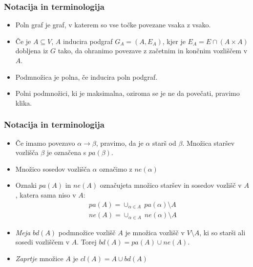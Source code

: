 \documentclass{beamer}
\begin{document}
\begin{frame}
    \frametitle{Notacija in terminologija}
    \begin{itemize}
        \item Poln graf je graf, v katerem so vse točke povezane vsaka z vsako.
        \item  Če je $A \subseteq V$, $A$ inducira podgraf $G_A = (A, E_A)$,
        kjer je $E_A = E \cap (A \times A)$ dobljena iz $G$ tako, da ohranimo povezave z 
        začetnim in končnim vozliščem v $A$.
        \item Podmnožica je polna, če inducira poln podgraf.
        \item Polni podmnožici, ki je maksimalna, oziroma se je ne da povečati, pravimo klika.
   
    \end{itemize}

\end{frame}
\begin{frame}
    \frametitle{Notacija in terminologija}
    \begin{itemize}
        \item Če imamo povezavo $ \alpha \longrightarrow \beta $, pravimo, da je $\alpha$ starš od $\beta$.
        Množica staršev vozlišča $\beta$ je označena s $pa(\beta)$.  
        \item Množico sosedov vozlišča $\alpha$ označimo z $ne(\alpha)$
        \item Oznaki $pa(A)$ in $ne(A)$ označujeta množico staršev in sosedov vozlišč v $A$,
        katera sama niso v $A$:
        \begin{align*}
              pa(A) = \cup_{\alpha \in A} ~ pa(\alpha) \setminus A \\
              ne(A) = \cup_{\alpha \in A} ~ ne(\alpha) \setminus A
        \end{align*}
        \item \emph{Meja} $bd(A)$ podmnožice vozlišč $A$ je množica vozlišč v $ V \setminus A $,
        ki so starši ali sosedi vozliščem v $A$. Torej $ bd(A) = pa(A) \cup ne(A)$. 
        \item \emph{Zaprtje} množice $A$ je $cl(A) = A \cup bd(A) $
    \end{itemize}

\end{frame}
\end{document}
